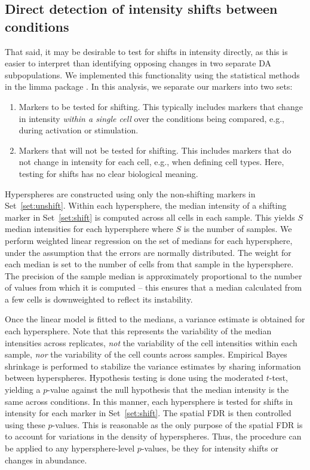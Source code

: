\documentclass{article}
\begin{document}
\subsection{Direct detection of intensity shifts between conditions}
That said, it may be desirable to test for shifts in intensity directly, as this is easier to interpret than identifying opposing changes in two separate DA subpopulations.
We implemented this functionality using the statistical methods in the limma package \cite{smyth2004linear}.
In this analysis, we separate our markers into two sets:
\begin{enumerate}
    \item Markers to be tested for shifting. 
        This typically includes markers that change in intensity \textit{within a single cell} over the conditions being compared, e.g., during activation or stimulation.
        \label{set:shift}
    \item Markers that will not be tested for shifting.
        This includes markers that do not change in intensity for each cell, e.g., when defining cell types.
        Here, testing for shifts has no clear biological meaning.
        \label{set:unshift}
\end{enumerate}
Hyperspheres are constructed using only the non-shifting markers in Set~\ref{set:unshift}.
Within each hypersphere, the median intensity of a shifting marker in Set~\ref{set:shift} is computed across all cells in each sample.
This yields $S$ median intensities for each hypersphere where $S$ is the number of samples.
We perform weighted linear regression on the set of medians for each hypersphere, under the assumption that the errors are normally distributed.
The weight for each median is set to the number of cells from that sample in the hypersphere.
The precision of the sample median is approximately proportional to the number of values from which it is computed \cite{rider1960variance} -- this ensures that a median calculated from a few cells is downweighted to reflect its instability.

Once the linear model is fitted to the medians, a variance estimate is obtained for each hypersphere.
Note that this represents the variability of the median intensities across replicates, \textit{not} the variability of the cell intensities within each sample, \textit{nor} the variability of the cell counts across samples.
Empirical Bayes shrinkage is performed to stabilize the variance estimates by sharing information between hyperspheres.
Hypothesis testing is done using the moderated $t$-test, yielding a $p$-value against the null hypothesis that the median intensity is the same across conditions. 
In this manner, each hypersphere is tested for shifts in intensity for each marker in Set~\ref{set:shift}.
The spatial FDR is then controlled using these $p$-values.
This is reasonable as the only purpose of the spatial FDR is to account for variations in the density of hyperspheres.
Thus, the procedure can be applied to any hypersphere-level $p$-values, be they for intensity shifts or changes in abundance.
\end{document}
